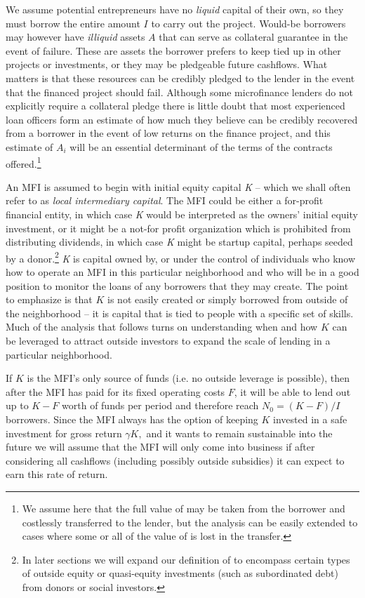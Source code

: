 \documentclass[
]{article}
\begin{document}
We assume potential entrepreneurs have no \emph{liquid} capital of their
own, so they must borrow the entire amount \(I\) to carry out the
project. Would-be borrowers may however have \emph{illiquid} assets
\(A\) that can serve as collateral guarantee in the event of failure.
These are assets the borrower prefers to keep tied up in other projects
or investments, or they may be pledgeable future cashflows. What matters
is that these resources can be credibly pledged to the lender in the
event that the financed project should fail. Although some microfinance
lenders do not explicitly require a collateral pledge there is little
doubt that most experienced loan officers form an estimate of how much
they believe can be credibly recovered from a borrower in the event of
low returns on the finance project, and this estimate of \(A_{i}\) will
be an essential determinant of the terms of the contracts
offered.\footnote{We assume here that the full value of may be taken
  from the borrower and costlessly transferred to the lender, but the
  analysis can be easily extended to cases where some or all of the
  value of is lost in the transfer.}

An MFI is assumed to begin with initial equity capital \emph{K} -- which
we shall often refer to as \emph{local intermediary capital}. The MFI
could be either a for-profit financial entity, in which case \emph{K}
would be interpreted as the owners' initial equity investment, or it
might be a not-for profit organization which is prohibited from
distributing dividends, in which case \emph{K} might be startup capital,
perhaps seeded by a donor.\footnote{In later sections we will expand our
  definition of to encompass certain types of outside equity or
  quasi-equity investments (such as subordinated debt) from donors or
  social investors.} \emph{K} is capital owned by, or under the control
of individuals who know how to operate an MFI in this particular
neighborhood and who will be in a good position to monitor the loans of
any borrowers that they may create. The point to emphasize is that \(K\)
is not easily created or simply borrowed from outside of the
neighborhood -- it is capital that is tied to people with a specific set
of skills. Much of the analysis that follows turns on understanding when
and how \(K\) can be leveraged to attract outside investors to expand
the scale of lending in a particular neighborhood.

If \(K\) is the MFI's only source of funds (i.e. no outside leverage is
possible), then after the MFI has paid for its fixed operating costs
\(F\), it will be able to lend out up to \(K - F\) worth of funds per
period and therefore reach \(N_{0} = (K - F)/I\) borrowers. Since the
MFI always has the option of keeping \(K\) invested in a safe investment
for gross return \(\gamma K,\) and it wants to remain sustainable into
the future we will assume that the MFI will only come into business if
after considering all cashflows (including possibly outside subsidies)
it can expect to earn this rate of return.
\end{document}
